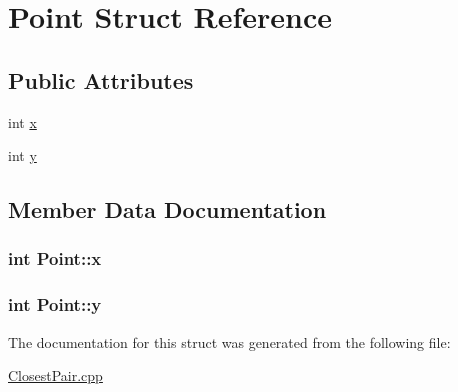 \hypertarget{structPoint}{}\section{Point Struct Reference}
\label{structPoint}
\subsection*{Public Attributes}
\begin{DoxyCompactItemize}
\item 
int \hyperlink{structPoint_a8c779e11e694b20e0946105a9f5de842}{x}
\item 
int \hyperlink{structPoint_a2e1b5fb2b2a83571f5c0bc0f66a73cf7}{y}
\end{DoxyCompactItemize}


\subsection{Member Data Documentation}
\subsubsection[{\texorpdfstring{x}{x}}]{\setlength{\rightskip}{0pt plus 5cm}int Point\+::x}\hypertarget{structPoint_a8c779e11e694b20e0946105a9f5de842}{}\label{structPoint_a8c779e11e694b20e0946105a9f5de842}
\subsubsection[{\texorpdfstring{y}{y}}]{\setlength{\rightskip}{0pt plus 5cm}int Point\+::y}\hypertarget{structPoint_a2e1b5fb2b2a83571f5c0bc0f66a73cf7}{}\label{structPoint_a2e1b5fb2b2a83571f5c0bc0f66a73cf7}


The documentation for this struct was generated from the following file\+:\begin{DoxyCompactItemize}
\item 
\hyperlink{ClosestPair_8cpp}{Closest\+Pair.\+cpp}\end{DoxyCompactItemize}
